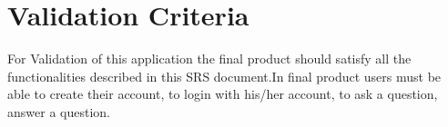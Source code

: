 \documentclass[journal,12pt,onecolumn,draftclsnofoot,]{IEEEtran}
\begin{document}
\section{Validation Criteria}
For Validation of this application the final product should satisfy all the functionalities described in this SRS document.In final product users must be able to create their account, to login with his/her account, to ask a question, answer a question.
\end{document}
